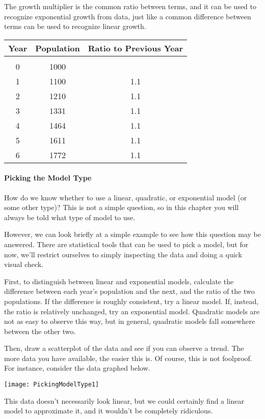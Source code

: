 The growth multiplier is the common ratio between terms, and it can be used to recognize exponential growth from data, just like a common difference between terms can be used to recognize linear growth.
\begin{center}
\begin{tabular}{c c c}
\textbf{Year} & \textbf{Population} & \textbf{Ratio to Previous Year}\\
\hline
& & \\
0 & 1000 &\\
1 & 1100 & 1.1\\
2 & 1210 & 1.1\\
3 & 1331 & 1.1\\
4 & 1464 & 1.1\\
5 & 1611 & 1.1\\
6 & 1772 & 1.1
\end{tabular}
\end{center}

\paragraph{Picking the Model Type}
How do we know whether to use a linear, quadratic, or exponential model (or some other type)?  This is not a simple question, so in this chapter you will always be told what type of model to use.

However, we can look briefly at a simple example to see how this question may be answered.  There are statistical tools that can be used to pick a model, but for now, we'll restrict ourselves to simply inspecting the data and doing a quick visual check.

First, to distinguish between linear and exponential models, calculate the difference between each year's population and the next, and the ratio of the two populations.  If the difference is roughly consistent, try a linear model.  If, instead, the ratio is relatively unchanged, try an exponential model.  Quadratic models are not as easy to observe this way, but in general, quadratic models fall somewhere between the other two.

Then, draw a scatterplot of the data and see if you can observe a trend.  The more data you have available, the easier this is.  Of course, this is not foolproof.  For instance, consider the data graphed below.
\begin{center}
\texttt{[image: PickingModelType1]}
\end{center}

This data doesn't necessarily look linear, but we could certainly find a linear model to approximate it, and it wouldn't be completely ridiculous.

